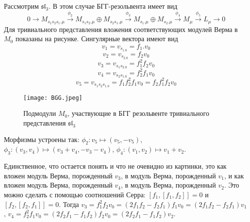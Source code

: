 \documentclass[a4article]{article}
\begin{document}
\begin{example}
Рассмотрим $\mathfrak{sl}_3$. В этом случае БГГ-резольвента имеет вид
\begin{equation}
    0 \rightarrow M_{s_1s_2s_1.\mu}\xrightarrow{\phi_2} M_{s_1s_2.\mu}\oplus M_{s_2s_1.\mu} \xrightarrow{\phi_3} M_{s_1.\mu}\oplus M_{s_2.\mu} \xrightarrow{\phi_4} M_{\mu} \xrightarrow{\phi_5} L_{\mu} \rightarrow 0
\end{equation}
Для тривиального представления вложения соответствующих модулей Верма в $M_0$ показаны на рисунке. Сингулярные вектора имеют вид $$v_1 = v_{s_1.0}=f_1.v_0$$ $$v_2=v_{s_2.0}=f_2v_0$$ $$v_3 = v_{s_1s_2.0}=f_1^2f_2v_0$$ $$v_4=v_{s_2s_1.0}=f_2^2f_1v_0$$ $$v_5=v_{s_1s_2s_1.0}=f_1f_2^2f_1v_0=f_2f_1^2f_2v_0$$
    \begin{figure}[h!]
    \centering
    \texttt{[image: BGG.jpeg]}
    \caption{Подмодули $M_{0}$, участвующие в БГГ резольвенте тривиального представления $\mathfrak{sl}_3$}
    \label{fig:enter-label}
\end{figure}

Морфизмы устроены так:
$\phi_2: v_5 \mapsto (v_5, -v_5)$, $\phi_3: (v_3, v_4) \mapsto (v_3+v_4, -v_3-v_4)$, $\phi_4: (v_1, v_2) \mapsto v_1+v_2$.

Единственное, что остается понять и что не очевидно из картинки, это как вложен модуль Верма, порожденный $v_3$, в модуль Верма, порожденный $v_1$, и как вложен модуль Верма, порожденный $v_4$, в модуль Верма, порожденный $v_2$. Это можно сделать с помощью соотношений Серра: $[f_1, [f_1,f_2]]=0$ и $[f_2, [f_2,f_1]]=0$. Тогда $v_3 = f_1^2f_2v_0=(2f_1f_2-f_2f_1)f_1v_0=(2f_1f_2-f_2f_1)v_1$, $v_4=f_2^2f_1v_0=(2f_2f_1-f_1f_2)f_2v_0=(2f_2f_1-f_1f_2)v_2$.

\end{example}
\end{document}
